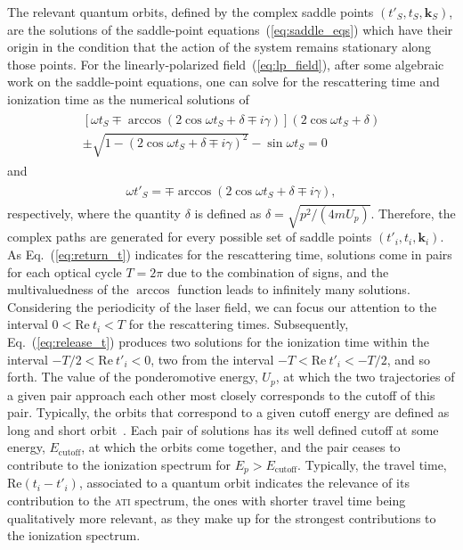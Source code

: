 The relevant quantum orbits, defined by the complex saddle points
$(t'_{S}, t_{S}, \mathbf{k}_{S})$, are the solutions of the
saddle-point equations~(\ref{eq:saddle_eqs}) which have their origin
in the condition that the action of the system remains stationary
along those points. For the linearly-polarized
field~(\ref{eq:lp_field}), after some algebraic work on the
saddle-point equations, one can solve for the rescattering time and
ionization time as the numerical solutions of~\cite{KopoldOptComm2000}
%
\begin{eqnarray}
  \label{eq:return_t}
  \begin{split}
    [\omega t_{S} \mp \arccos(2\cos\omega t_{S} + \delta \mp i\gamma)]
    (2\cos\omega t_{S} + \delta) \\
    \pm \sqrt{1 - (2\cos\omega t_{S} + \delta \mp i\gamma)^{2}} 
    - \sin\omega t_{S} = 0
  \end{split}
\end{eqnarray}
%
and
%
\begin{eqnarray}
  \label{eq:release_t}
  \begin{split}
    \omega t'_{S} = \mp \arccos(2\cos\omega t_{S} + \delta \mp i\gamma),
  \end{split}
\end{eqnarray}  
%
respectively, where the quantity $\delta$ is defined as $\delta =
\sqrt{p^{2} / (4mU_{p})}$. Therefore, the complex paths are generated
for every possible set of saddle points $(t'_{i}, t_{i},
\mathbf{k}_{i})$. As Eq.~(\ref{eq:return_t}) indicates for the
rescattering time, solutions come in pairs for each optical cycle $T =
2\pi$ due to the combination of signs, and the multivaluedness of the
$\arccos$ function leads to infinitely many solutions. Considering the
periodicity of the laser field, we can focus our attention to the
interval $0 < \mathrm{Re}\ t_{i} < T$ for the rescattering
times. Subsequently, Eq.~(\ref{eq:release_t}) produces two solutions
for the ionization time within the interval $-T/2 <
\mathrm{Re}\ t'_{i} < 0$, two from the interval $-T <
\mathrm{Re}\ t'_{i} < -T/2$, and so forth. The value of the
ponderomotive energy, $U_{p}$, at which the two trajectories of a
given pair approach each other most closely corresponds to the cutoff
of this pair. Typically, the orbits that correspond to a given cutoff
energy are defined as long and short
orbit~\cite{BeckerRescattering_2018}. Each pair of solutions has its
well defined cutoff at some energy, $E_{\mathrm{cutoff}}$, at which
the orbits come together, and the pair ceases to contribute to the
ionization spectrum for $E_{p} > E_{\mathrm{cutoff}}$. Typically, the
travel time, $\mathrm{Re}(t_{i} - t'_{i})$, associated to a quantum
orbit indicates the relevance of its contribution to the \textsc{ati}
spectrum, the ones with shorter travel time being qualitatively more
relevant, as they make up for the strongest contributions to the
ionization spectrum.

